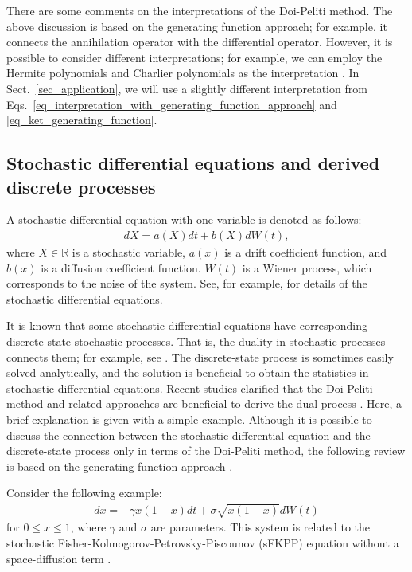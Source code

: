 \documentclass[sn-mathphys,Numbered]{sn-jnl}%
\theoremstyle{thmstyleone}%
\theoremstyle{thmstyletwo}%
\theoremstyle{thmstylethree}%
\begin{document}
There are some comments on the interpretations of the Doi-Peliti method. The above discussion is based on the generating function approach; for example, it connects the annihilation operator with the differential operator. However, it is possible to consider different interpretations; for example, we can employ the Hermite polynomials and Charlier polynomials as the interpretation \cite{Ohkubo2012}. In Sect.~\ref{sec_application}, we will use a slightly different interpretation from Eqs.~\eqref{eq_interpretation_with_generating_function_approach} and \eqref{eq_ket_generating_function}. 




\subsection{Stochastic differential equations and derived discrete processes}
\label{sec_review_dual}

A stochastic differential equation with one variable is denoted as follows:
\begin{align}
dX = a(X) dt + b(X) dW(t),
\label{eq_sde_one_variable}
\end{align} 
where $X \in \mathbb{R}$ is a stochastic variable, $a(x)$ is a drift coefficient function, and $b(x)$ is a diffusion coefficient function. $W(t)$ is a Wiener process, which corresponds to the noise of the system. See, for example, \cite{Gardiner2009} for details of the stochastic differential equations.

It is known that some stochastic differential equations have corresponding discrete-state stochastic processes. That is, the duality in stochastic processes connects them; for example, see \cite{Shiga1986,Giardina2007,Giardina2009,Carinci2013,Carinci2015}. The discrete-state process is sometimes easily solved analytically, and the solution is beneficial to obtain the statistics in stochastic differential equations. Recent studies clarified that the Doi-Peliti method and related approaches are beneficial to derive the dual process \cite{Ohkubo2010,Ohkubo2013,Greenman2020}. Here, a brief explanation is given with a simple example. Although it is possible to discuss the connection between the stochastic differential equation and the discrete-state process only in terms of the Doi-Peliti method, the following review is based on the generating function approach \cite{Ohkubo2019}.


Consider the following example:
\begin{align}
dx = - \gamma x(1-x) dt + \sigma \sqrt{x(1-x)} dW(t)
\label{eq_sFKPP}
\end{align}
for $0 \le x \le 1$, where $\gamma$ and $\sigma$ are parameters. This system is related to the stochastic Fisher-Kolmogorov-Petrovsky-Piscounov (sFKPP) equation without a space-diffusion term \cite{Panja2004}.
\end{document}
